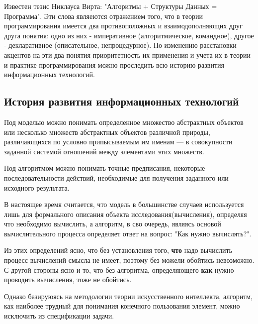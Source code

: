 \documentclass[a4paper,12pt]{report}
\begin{document}
	Известен тезис Никлауса Вирта: "Алгоритмы + Структуры Данных = Программа".
	Эти слова являеются отражением того, что в теории программирования имеется
	два противоположных и взаимодополняющих друг друга понятия: одно из них -
	императивное (алгоритмическое, командное), другое - декларативное
	(описательное, непроцедурное). По изменению расстановки акцентов на эти два
	понятия приоритетность их применения и учета их в теории и практике
	программирования можно проследить всю историю развития информационных
	технологий.


\subsection{История развития информационных технологий}

	Под моделью можно понимать определенное множество абстрактных объектов или
	несколько множеств абстрактных объектов различной природы, различающихся по
	условно припысываемым им именам — в совокупности заданной системой отношений
	между элементами этих множеств.\par
	Под алгоритмом можно понимать точные предписания, некоторые
	последовательности действий, необходимые для получения заданного или
	исходного результата.\par
	В настоящее время считается, что модель в большинстве случаев используется
	лишь для формального описания объекта исследования(вычисления), определяя что
	необходимо вычислить, а алгоритм, в сво очередь, являясь основой
	вычислительного процесса определяет ответ на вопрос: "Как нужно
	вычислять?".\par
	Из этих определений ясно, что без установления того, \textbf{что} надо
	вычислить процесс вычислений смысла не имеет, поэтому без можели обойтись
	невозможно. С другой стороны ясно и то, что без алгоритма, определяющего
	\textbf{как} нужно проводить вычисления, тоже не обойтись.\par
	Однако базируюясь на методологии теории искусственного интеллекта, алгоритм,
	как наиболее трудный для понимания конечного пользования элемент, можно
	исключить из спецификации задачи.\par
\end{document}
